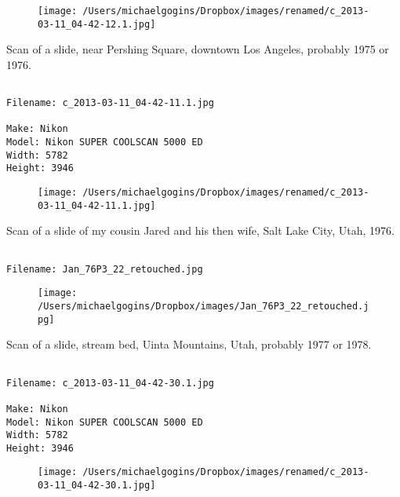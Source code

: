 \documentclass[11pt,letter,DIV=14,paper=landscape]{scrbook}
\begin{document}
\begin{figure}
\texttt{[image: /Users/michaelgogins/Dropbox/images/renamed/c\_2013-03-11\_04-42-12.1.jpg]}
\end{figure}
    
\clearpage
\noindent Scan of a slide, near Pershing Square, downtown Los Angeles, probably 1975 or 1976.
\noindent
\begin{lstlisting}

Filename: c_2013-03-11_04-42-11.1.jpg

Make: Nikon
Model: Nikon SUPER COOLSCAN 5000 ED
Width: 5782
Height: 3946
\end{lstlisting}
\clearpage

\begin{figure}
\texttt{[image: /Users/michaelgogins/Dropbox/images/renamed/c\_2013-03-11\_04-42-11.1.jpg]}
\end{figure}
    
\clearpage
\noindent Scan of a slide of my cousin Jared and his then wife, Salt Lake City, Utah, 1976.
\noindent
\begin{lstlisting}

Filename: Jan_76P3_22_retouched.jpg

\end{lstlisting}
\clearpage

\begin{figure}
\texttt{[image: /Users/michaelgogins/Dropbox/images/Jan\_76P3\_22\_retouched.jpg]}
\end{figure}
    
\clearpage
\noindent Scan of a slide, stream bed, Uinta Mountains, Utah, probably 1977 or 1978.
\noindent
\begin{lstlisting}

Filename: c_2013-03-11_04-42-30.1.jpg

Make: Nikon
Model: Nikon SUPER COOLSCAN 5000 ED
Width: 5782
Height: 3946
\end{lstlisting}
\clearpage

\begin{figure}
\texttt{[image: /Users/michaelgogins/Dropbox/images/renamed/c\_2013-03-11\_04-42-30.1.jpg]}
\end{figure}
    
\end{document}

